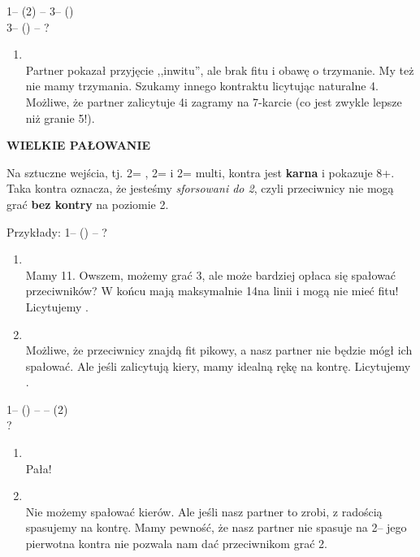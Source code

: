\documentclass[12pt, a4paper]{article}
\begin{document}
1\nt -- (2\spades) -- 3\diams -- (\pass)\\
3\spades -- (\pass) -- ?
\begin{enumerate}
    \item 
        \\
        Partner pokazał przyjęcie ,,inwitu'', ale brak fitu i
        obawę o trzymanie. My też nie mamy trzymania. Szukamy
        innego kontraktu licytując naturalne 4\diams. Możliwe,
        że partner zalicytuje 4\hearts i zagramy na 7-karcie (co jest zwykle
        lepsze niż granie 5\minor!).
\end{enumerate}

\vspace{1cm}
\textbf{WIELKIE PAŁOWANIE}

Na sztuczne wejścia, tj. 2\clubs = \major, 2\nt = \minor i 2\diams = multi,
kontra jest \textbf{karna} i pokazuje 8+\hcp.
Taka kontra oznacza, że jesteśmy \textit{sforsowani do 2\nt}, czyli przeciwnicy
nie mogą grać \textbf{bez kontry} na poziomie 2.

Przykłady:
1\nt -- (\alrts{2\clubs}) -- ?
\begin{enumerate}
    \item 
        \\
        Mamy 11\hcp. Owszem, możemy grać 3\nt, ale może bardziej opłaca się spałować przeciwników?
        W końcu mają maksymalnie 14\hcp na linii i mogą nie mieć fitu!
        Licytujemy \dbl.
    \item 
        \\
        Możliwe, że przeciwnicy znajdą fit pikowy, a nasz partner nie będzie
        mógł ich spałować. Ale jeśli zalicytują kiery, mamy idealną rękę na kontrę.
        Licytujemy \dbl.
\end{enumerate}

1\nt -- (\alrts{2\clubs}) -- \dbl -- (2\hearts)\\
?
\begin{enumerate}
    \item 
        \\
        Pała!
    \item 
        \\
        Nie możemy spałować kierów. Ale jeśli nasz partner
        to zrobi, z radością spasujemy na kontrę.
        Mamy pewność, że nasz partner nie spasuje na
        2\hearts -- jego pierwotna kontra nie pozwala nam
        dać przeciwnikom grać 2\hearts.
\end{enumerate}
\end{document}
